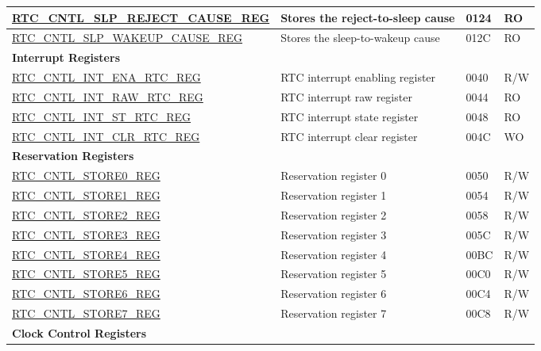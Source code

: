 \begin{longtable}{ | p{6.5cm} | p{6.8cm} | p{1.3cm} | p{1cm} | }
\hyperref[regdesc:RTCCNTLSLPREJECTCAUSEREG]{RTC\_CNTL\_SLP\_REJECT\_CAUSE\_REG} & Stores the reject-to-sleep cause  & \hexprefix{}0124 & RO \\ \hline
\hyperref[regdesc:RTCCNTLSLPWAKEUPCAUSEREG]{RTC\_CNTL\_SLP\_WAKEUP\_CAUSE\_REG} & Stores the sleep-to-wakeup cause  & \hexprefix{}012C & RO \\ \hline
\multicolumn{4}{|l|}{\textbf{Interrupt Registers}} \\ \hline
\hyperref[regdesc:RTCCNTLINTENARTCREG]{RTC\_CNTL\_INT\_ENA\_RTC\_REG} & RTC interrupt enabling register & \hexprefix{}0040 & R/W \\ \hline
\hyperref[regdesc:RTCCNTLINTRAWRTCREG]{RTC\_CNTL\_INT\_RAW\_RTC\_REG} & RTC interrupt raw register & \hexprefix{}0044 & RO \\ \hline
\hyperref[regdesc:RTCCNTLINTSTRTCREG]{RTC\_CNTL\_INT\_ST\_RTC\_REG} & RTC interrupt state register & \hexprefix{}0048 & RO \\ \hline
\hyperref[regdesc:RTCCNTLINTCLRRTCREG]{RTC\_CNTL\_INT\_CLR\_RTC\_REG} & RTC interrupt clear register & \hexprefix{}004C & WO \\ \hline
\multicolumn{4}{|l|}{\textbf{Reservation Registers}} \\ \hline
\hyperref[regdesc:RTCCNTLSTORE0REG]{RTC\_CNTL\_STORE0\_REG} & Reservation register 0 & \hexprefix{}0050 & R/W \\ \hline
\hyperref[regdesc:RTCCNTLSTORE1REG]{RTC\_CNTL\_STORE1\_REG} & Reservation register 1 & \hexprefix{}0054 & R/W \\ \hline
\hyperref[regdesc:RTCCNTLSTORE2REG]{RTC\_CNTL\_STORE2\_REG} & Reservation register 2 & \hexprefix{}0058 & R/W \\ \hline
\hyperref[regdesc:RTCCNTLSTORE3REG]{RTC\_CNTL\_STORE3\_REG} & Reservation register 3 & \hexprefix{}005C & R/W \\ \hline
\hyperref[regdesc:RTCCNTLSTORE4REG]{RTC\_CNTL\_STORE4\_REG} & Reservation register 4 & \hexprefix{}00BC & R/W \\ \hline
\hyperref[regdesc:RTCCNTLSTORE5REG]{RTC\_CNTL\_STORE5\_REG} & Reservation register 5 & \hexprefix{}00C0 & R/W \\ \hline
\hyperref[regdesc:RTCCNTLSTORE6REG]{RTC\_CNTL\_STORE6\_REG} & Reservation register 6 & \hexprefix{}00C4 & R/W \\ \hline
\hyperref[regdesc:RTCCNTLSTORE7REG]{RTC\_CNTL\_STORE7\_REG} & Reservation register 7 & \hexprefix{}00C8 & R/W \\ \hline
\multicolumn{4}{|l|}{\textbf{Clock Control Registers}} \\ \hline

\end{longtable}
